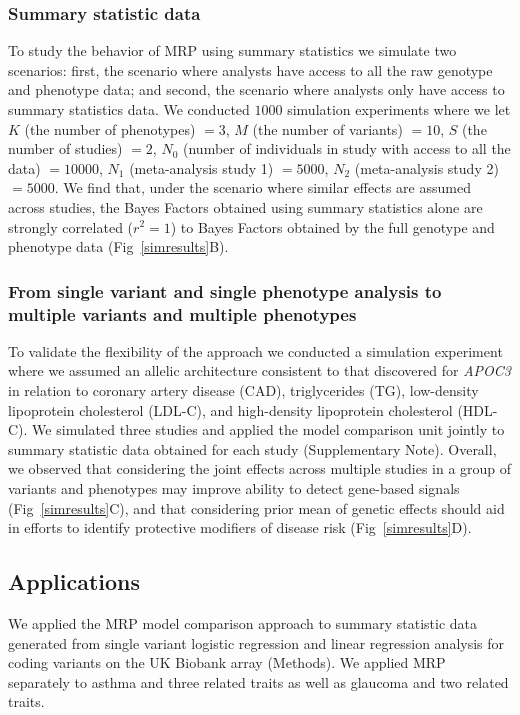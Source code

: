 \subsubsection*{Summary statistic data}
To study the behavior of MRP using summary statistics we simulate two scenarios: first, the scenario where analysts have access to all the raw genotype and phenotype data; and second, the scenario where analysts only have access to summary statistics data\cite{liu2014meta}. We conducted $1000$ simulation experiments where we let $K$ (the number of phenotypes) $=3$, $M$ (the number of variants) $=10$, $S$ (the number of studies) $=2$, $N_0$ (number of individuals in study with access to all the data) $= 10000$, $N_1$ (meta-analysis study 1) $= 5000$, $N_2$ (meta-analysis study 2) $= 5000$. We find that, under the scenario where similar effects are assumed across studies, the Bayes Factors obtained using summary statistics alone are strongly correlated ($r^2 = 1$) to Bayes Factors obtained by the full genotype and phenotype data (Fig~\ref{simresults}B).

\subsubsection*{From single variant and single phenotype analysis to multiple variants and multiple phenotypes}
To validate the flexibility of the approach we conducted a simulation experiment where we assumed an allelic architecture consistent to that discovered for {\it APOC3} in relation to coronary artery disease (CAD), triglycerides (TG), low-density lipoprotein cholesterol (LDL-C), and high-density lipoprotein cholesterol (HDL-C)\cite{apoc3,apoc32,jorgensen2014loss,cohorts2014loss}. We simulated three studies and applied the model comparison unit jointly to summary statistic data obtained for each study (Supplementary Note). Overall, we observed that considering the joint effects across multiple studies in a group of variants and phenotypes may improve ability to detect gene-based signals (Fig~\ref{simresults}C), and that considering prior mean of genetic effects should aid in efforts to identify protective modifiers of disease risk (Fig~\ref{simresults}D).

\subsection*{Applications}
We applied the MRP model comparison approach to summary statistic data generated from single variant logistic regression and linear regression analysis for coding variants on the UK Biobank array (Methods). We applied MRP separately to asthma and three related traits as well as glaucoma and two related traits.

